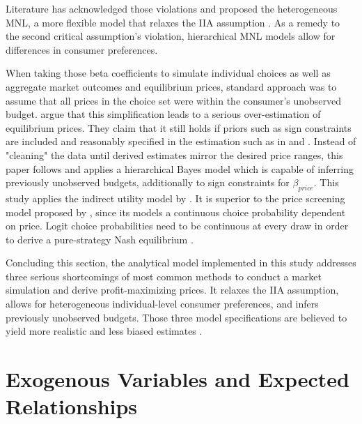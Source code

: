 \documentclass[12pt,a4paper]{article}
\begin{document}
Literature has acknowledged those violations and proposed the heterogeneous MNL, a more flexible model that relaxes the IIA assumption \citep{steckelHeterogeneousConditionalLogit1988}.
As a remedy to the second critical assumption's violation, hierarchical MNL models allow for differences in consumer preferences.

When taking those beta coefficients to simulate individual choices as well as aggregate market outcomes and equilibrium prices,
standard approach was to assume that all prices in the choice set were within the consumer's unobserved budget.
\cite{pachaliPerilsIgnoringBudget2017} argue that this simplification leads to a serious over-estimation of equilibrium prices.
They claim that it still holds if priors such as sign constraints are included and reasonably specified in the estimation such as in \cite{sonnierHeterogeneityDistributionsWillingnesstopay2007} and \cite{allenbyEconomicValuationProduct2014}.
Instead of "cleaning" the data until derived estimates mirror the desired price ranges, this paper follows \cite{pachaliPerilsIgnoringBudget2017}
and applies a hierarchical Bayes model which is capable of inferring previously unobserved budgets, additionally to sign constraints for $\beta_{price}$.
This study applies the indirect utility model by \cite{berryAutomobilePricesMarket1995}.
It is superior to the price screening model proposed by \cite{gilbrideChoiceModelConjunctive2004},
since its models a continuous choice probability dependent on price.
Logit choice probabilities need to be continuous at every draw in order to derive a pure-strategy Nash equilibrium \citep{morrowFixedPointApproachesComputing2011, pachaliPerilsIgnoringBudget2017}.

Concluding this section, the analytical model implemented in this study addresses three serious shortcomings of most common methods to conduct a market simulation and derive profit-maximizing prices.
It relaxes the IIA assumption, allows for heterogeneous individual-level consumer preferences, and infers previously unobserved budgets.
Those three model specifications are believed to yield more realistic and less biased estimates \citep{chandukalaChoiceModelsMarketing2008, pachaliPerilsIgnoringBudget2017}.


\section{Exogenous Variables and Expected Relationships}
\end{document}

